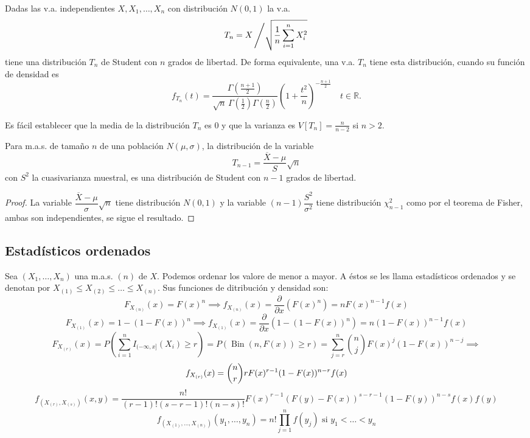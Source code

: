 \begin{definición}
    Dadas las v.a. independientes $X, X_1, \ldots, X_n$ con distribución $N(0,1)$ la v.a.
    \[
    T_n = X \left/ \sqrt{\frac{1}{n} \sum_{i=1}^n X_i^2} \right.
    \]
    tiene una distribución $T_n$ de Student con $n$ grados de libertad. De forma equivalente, una v.a. $T_n$ tiene esta distribución, cuando su función de densidad es
    \begin{equation}
    \label{1.5.3.3}
    f_{T_n}(t) = \frac{\Gamma\left( \frac{n+1}{2} \right)}{\sqrt{n} \, \Gamma\left( \frac{1}{2} \right) \Gamma\left( \frac{n}{2} \right)} \left( 1 + \frac{t^2}{n} \right)^{-\frac{n+1}{2}} \quad t \in \mathbb{R}.
    \end{equation}
    
    Es fácil establecer que la media de la distribución $T_n$ es $0$ y que la varianza es $V[T_n] = \frac{n}{n-2}$ si $n > 2$.
\end{definición}

\begin{corolario}
        Para m.a.s. de tamaño $n$ de una población $N(\mu, \sigma)$, la distribución de la variable
        \[
        T_{n-1} = \frac{\overline{X} - \mu}{S} \sqrt{n}
        \]
        con $S^2$ la cuasivarianza muestral, es una distribución de Student con $n - 1$ grados de libertad.       
\end{corolario}

\begin{proof}
    La variable $\dfrac{\overline{X} - \mu}{\sigma} \sqrt{n}$ tiene distribución $N(0,1)$ y la variable $(n - 1) \dfrac{S^2}{\sigma^2}$ tiene distribución $\chi^2_{n-1}$ como por el teorema de Fisher, ambas son independientes, se sigue el resultado.
\end{proof}

\subsection{Estadísticos ordenados}
\begin{definición}
Sea $\left(X_{1}, \ldots, X_{n}\right)$ una m.a.s. $(n)$ de $X$. Podemos ordenar los valore de menor a mayor. A éstos se les llama estadísticos ordenados y se denotan por $X_{(1)} \leq X_{(2)} \leq \ldots \leq X_{(n)}$.
Sus funciones de ditribución y densidad son:
$$F_{X_{(n)}}(x)=F(x)^{n} \implies f_{X_{(n)}}(x)= \frac{\partial}{\partial{x}}(F(x)^n) = n F(x)^{n-1} f(x)$$
$$F_{X_{(1)}}(x)=1-(1-F(x))^{n} \implies f_{X_{(1)}}(x)= \frac{\partial}{\partial{x}}(1-(1-F(x))^n) = n(1-F(x))^{n-1} f(x)$$
$$F_{X_{(r)}}(x) = P\left(\sum_{i=1}^{n} I_{(-\infty, x]}(X_i) \geq r\right) = P(\operatorname{Bin}(n, F(x)) \geq r) = \sum_{j=r}^{n} \binom{n}{j} F(x)^j(1-F(x))^{n-j} \implies$$  $$\\ f_{X_{(r)}}(x) = \binom{n}{r} r F(x)^{r-1}(1-F(x))^{n-r} f(x)$$
$$f_{\left(X_{(r)}, X_{(s)}\right)}(x, y) = \frac{n!}{(r-1)!(s-r-1)!(n-s)!} F(x)^{r-1}(F(y)-F(x))^{s-r-1}(1-F(y))^{n-s} f(x) f(y)$$
$$f_{\left(X_{(1)}, \ldots, X_{(n)}\right)}(y_1, \ldots, y_n) = n! \prod_{j=1}^{n} f(y_j) \text{ si } y_1 < \ldots < y_n$$
\end{definición}

